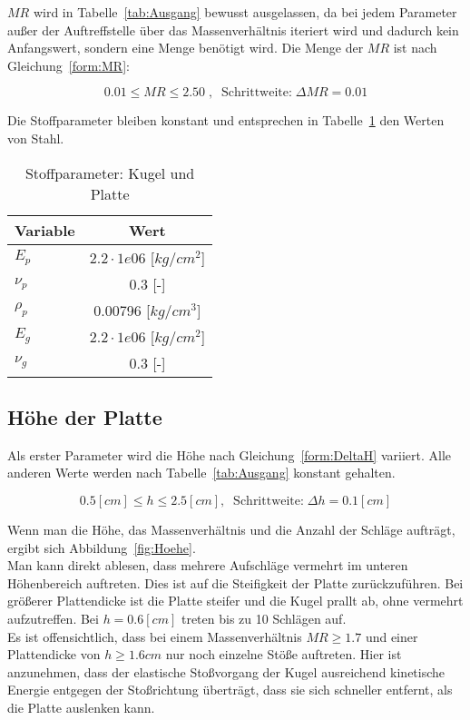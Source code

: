 $MR$ wird in Tabelle~\ref{tab:Ausgang} bewusst ausgelassen, da bei jedem Parameter außer der Auftreffstelle über das Massenverhältnis iteriert wird und dadurch kein Anfangswert, sondern eine Menge benötigt wird. Die Menge der $MR$ ist nach Gleichung~\ref{form:MR}:

\begin{equation}
	\label{form:MR}
	0.01 \leq MR \leq 2.50 \; , \;\; \mbox{Schrittweite:} \; \Delta MR = 0.01
\end{equation}

Die Stoffparameter bleiben konstant und entsprechen in Tabelle~\ref{tab:Stoff} den Werten von Stahl.

\begin{table}[H]
	\begin{center}
		\caption{Stoffparameter: Kugel und Platte}
		\label{tab:Stoff}
		\begin{tabular}{l|c}
			\textbf{Variable} & \textbf{Wert}\\
			\hline
			$E_{p}$ & $2.2 \cdot 1e06$ [$kg/cm^2$]\\
			$\nu_{p}$ & 0.3 [-]\\
			$\rho_{p}$ & 0.00796 [$kg/cm^{3}$]\\
			\hline
			$E_{g}$ &  $2.2 \cdot 1e06$ [$kg/cm^2$]\\
			$\nu_{g}$ & 0.3 [-]\\		
		\end{tabular}
	\end{center}
\end{table}

\subsection{Höhe der Platte}

Als erster Parameter wird die Höhe nach Gleichung~\ref{form:DeltaH} variiert. Alle anderen Werte werden nach Tabelle~\ref{tab:Ausgang} konstant gehalten.

\begin{equation}
	\label{form:DeltaH}
	0.5 [cm] \leq h \leq 2.5 [cm], \; \; \mbox{Schrittweite:} \; \Delta h = 0.1 [cm]
\end{equation}

Wenn man die Höhe, das Massenverhältnis und die Anzahl der Schläge aufträgt, ergibt sich Abbildung~\ref{fig:Hoehe}.\\
Man kann direkt ablesen, dass mehrere Aufschläge vermehrt im unteren Höhenbereich auftreten. Dies ist auf die Steifigkeit der Platte zurückzuführen. Bei größerer Plattendicke ist die Platte steifer und die Kugel prallt ab, ohne vermehrt aufzutreffen. Bei $h = 0.6 [cm]$ treten bis zu 10 Schlägen auf.\\
Es ist offensichtlich, dass bei einem Massenverhältnis $MR \geq 1.7$ und einer Plattendicke von $h \geq 1.6 cm$ nur noch einzelne Stöße auftreten. Hier ist anzunehmen, dass der elastische Stoßvorgang der Kugel ausreichend kinetische Energie entgegen der Stoßrichtung überträgt, dass sie sich schneller entfernt, als die Platte auslenken kann. \\

